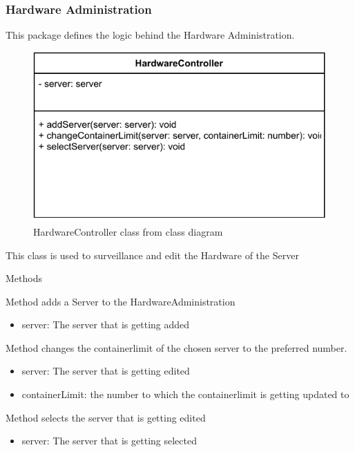 \subsubsection{Hardware Administration}
This package defines the logic behind the Hardware Administration.



\begin{figure}[H]
\centerline{\includegraphics[scale=1]{res/Klassen/HardwareControllerClass.pdf}}
\caption{HardwareController class from class diagram}
\end{figure}

This class is used to surveillance and edit the Hardware of the Server

\begin{methodenv}{Methods}


Method adds a Server to the HardwareAdministration

\begin{itemize}
	\item{server:}
	The server that is getting added
\end{itemize}



Method changes the containerlimit of the chosen server to the preferred number.

\begin{itemize}
	\item{server:}
	The server that is getting edited
	\item{containerLimit:}
	the number to which the containerlimit is getting updated to
\end{itemize}



Method selects the server that is getting edited

\begin{itemize}
	\item{server:}
	The server that is getting selected
\end{itemize}
\end{methodenv}




